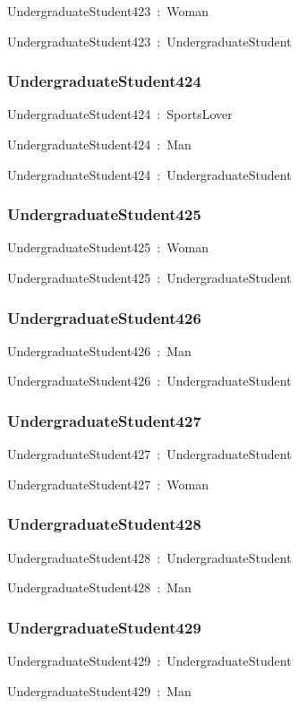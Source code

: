 \documentclass{article}
\begin{document}
UndergraduateStudent423~:~Woman

UndergraduateStudent423~:~UndergraduateStudent

\subsubsection*{UndergraduateStudent424}

UndergraduateStudent424~:~SportsLover

UndergraduateStudent424~:~Man

UndergraduateStudent424~:~UndergraduateStudent

\subsubsection*{UndergraduateStudent425}

UndergraduateStudent425~:~Woman

UndergraduateStudent425~:~UndergraduateStudent

\subsubsection*{UndergraduateStudent426}

UndergraduateStudent426~:~Man

UndergraduateStudent426~:~UndergraduateStudent

\subsubsection*{UndergraduateStudent427}

UndergraduateStudent427~:~UndergraduateStudent

UndergraduateStudent427~:~Woman

\subsubsection*{UndergraduateStudent428}

UndergraduateStudent428~:~UndergraduateStudent

UndergraduateStudent428~:~Man

\subsubsection*{UndergraduateStudent429}

UndergraduateStudent429~:~UndergraduateStudent

UndergraduateStudent429~:~Man
\end{document}
